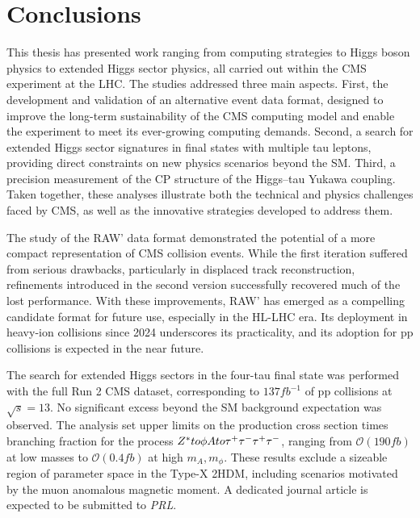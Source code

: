 \chapter{Conclusions}
\thispagestyle{plain}  %
\pagestyle{chapterpages}
\label{Section:Conclusions}

This thesis has presented work ranging from computing strategies to Higgs boson physics to extended Higgs sector physics, all carried out within the \ac{CMS} experiment at the \ac{LHC}. The studies addressed three main aspects. First, the development and validation of an alternative event data format, designed to improve the long-term sustainability of the CMS computing model and enable the experiment to meet its ever-growing computing demands. Second, a search for extended Higgs sector signatures in final states with multiple tau leptons, providing direct constraints on new physics scenarios beyond the \ac{SM}. Third, a precision measurement of the CP structure of the Higgs–tau Yukawa coupling. Taken together, these analyses illustrate both the technical and physics challenges faced by CMS, as well as the innovative strategies developed to address them.

The study of the RAW' data format demonstrated the potential of a more compact representation of \ac{CMS} collision events. While the first iteration suffered from serious drawbacks, particularly in displaced track reconstruction, refinements introduced in the second version successfully recovered much of the lost performance. With these improvements, RAW' has emerged as a compelling candidate format for future use, especially in the \ac{HL}-\ac{LHC} era. Its deployment in heavy-ion collisions since 2024 underscores its practicality, and its adoption for pp collisions is expected in the near future.

The search for extended Higgs sectors in the four-tau final state was performed with the full Run 2 CMS dataset, corresponding to $137\unit{fb}^{-1}$ of pp collisions at $\sqrt{s} = 13$\TeV. No significant excess beyond the \ac{SM} background expectation was observed. The analysis set upper limits on the production cross section times branching fraction for the process $Z^* to \phi A to \tau^+\tau^-\tau^+\tau^-$, ranging from $\mathcal{O}(190\unit{fb})$ at low masses to $\mathcal{O}(0.4\unit{fb})$ at high $m_A, m_\phi$. These results exclude a sizeable region of parameter space in the Type-X \ac{2HDM}, including scenarios motivated by the muon anomalous magnetic moment. A dedicated journal article is expected to be submitted to \textit{PRL}.

